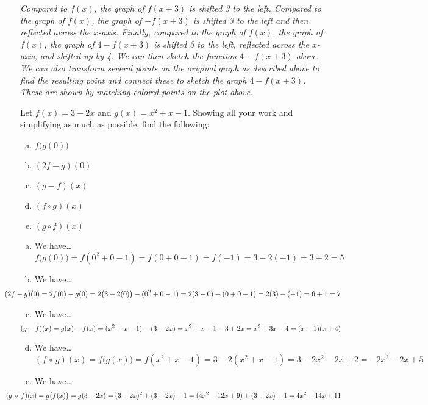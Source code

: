 \documentclass[12pt,letterpaper]{exam}
\begin{document}
\begin{questions}
{\itshape
\sol Compared to $f(x)$, the graph of $f(x + 3)$ is shifted 3 to the left. Compared to the graph of $f(x)$, the graph of $-f(x + 3)$ is shifted 3 to the left and then reflected across the $x$-axis. Finally, compared to the graph of $f(x)$, the graph of $f(x)$, the graph of $4 - f(x + 3)$ is shifted 3 to the left, reflected across the $x$-axis, and shifted up by 4. We can then sketch the function $4 - f(x + 3)$ above. We can also transform several points on the original graph as described above to find the resulting point and connect these to sketch the graph $4 - f(x + 3)$. These are shown by matching colored points on the plot above. 
}



\newpage
\question[10] Let $f(x)= 3 - 2x$ and $g(x)= x^2 + x - 1$. Showing all your work and simplifying as much as possible, find the following:
	\begin{enumerate}[(a)]
	\item $f \big( g(0) \big)$
	\item $(2f - g)(0)$
	\item $(g - f)(x)$
	\item $(f \circ g)(x)$
	\item $(g \circ f)(x)$
	\end{enumerate} \pspace

{\itshape
\sol 
\begin{enumerate}[(a)]
\item We have\dots
	\[
	f \big( g(0) \big)= f(0^2 + 0 - 1)= f(0 + 0 - 1)= f(-1)= 3 - 2(-1)= 3 + 2= 5
	\] \pspace

\item We have\dots
	\[
	\hspace{-1.5cm} (2f - g)(0)= 2f(0) - g(0)= 2 \big(3 - 2(0) \big) - (0^2 + 0 - 1)= 2 (3 - 0) - (0 + 0 - 1)= 2(3) - (-1)= 6 + 1= 7
	\] \pspace
 
\item We have\dots
	\[
	\hspace{-0.75cm} (g - f)(x)= g(x) - f(x)= (x^2 + x - 1) - (3 - 2x)= x^2 + x - 1 - 3 + 2x= x^2 + 3x - 4= (x - 1)(x + 4)
	\] \pspace
 
\item We have\dots
	\[
	(f\, \circ\, g)(x)= f \big( g(x) \big)= f(x^2 + x - 1)= 3 - 2(x^2 + x - 1)= 3 - 2x^2 - 2x + 2= -2x^2 - 2x + 5
	\] \pspace
 
\item We have\dots
	\[
	\hspace{-1.5cm} (g\, \circ\, f)(x)= g \big( f(x) \big)= g(3 - 2x)= (3 - 2x)^2 + (3 - 2x) - 1= (4x^2 - 12x + 9) + (3 - 2x) - 1= 4x^2 - 14x + 11
	\]  
\end{enumerate}
}




\end{questions}
\end{document}
